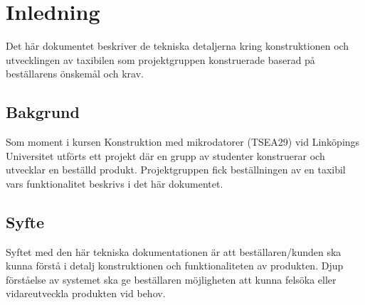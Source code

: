 \documentclass[tekniskrapport/tech.tex]{subfiles}
\begin{document}
\section{Inledning}
Det här dokumentet beskriver de tekniska detaljerna kring konstruktionen och
utvecklingen av taxibilen som projektgruppen konstruerade baserad på
beställarens önskemål och krav.

\subsection{Bakgrund}
Som moment i kursen Konstruktion med mikrodatorer (TSEA29) vid Linköpings
Universitet utförts ett projekt där en grupp av studenter konstruerar och
utvecklar en beställd produkt. Projektgruppen fick beställningen av en taxibil
vars funktionalitet beskrivs i det här dokumentet. 

\subsection{Syfte}
Syftet med den här tekniska dokumentationen är att beställaren/kunden ska kunna
förstå i detalj konstruktionen och funktionaliteten av produkten. Djup
förståelse av systemet ska ge beställaren möjligheten att kunna felsöka eller
vidareutveckla produkten vid behov. 
\end{document}
